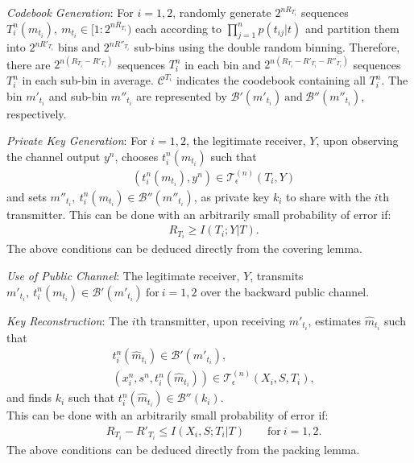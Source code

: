 \documentclass[conference,8pt]{IEEEtran}
\begin{document}
{{{{{{\emph{Codebook Generation}: For $i=1,2$, randomly generate $2^{nR_{T_i}}$ sequences $T^n_{i}(m_{t_i}), \ m_{t_i} \in {[1:2^{nR_{T_i}})}$ each according to $\prod_{j=1}^n p(t_{ij}|t)$ and partition them into $2^{nR'_{T_i}}$ bins and $2^{nR''_{T_i}}$ sub-bins using the double random binning. Therefore, there are $2^{n(R_{T_i}-R'_{T_i})}$ sequences $T^n_{i}$ in each bin and $2^{n(R_{T_i}-R'_{T_i}-R''_{T_i})}$ sequences $T^n_{i}$ in each sub-bin in average. $\mathcal{C}^{T_i}$ indicates the coodebook containing all $T^n_i$. The bin $m'_{t_i}$ and sub-bin $m''_{t_i}$ are represented by $\mathcal{B}'(m'_{t_i}) \ \text{and} \ \mathcal{B}''(m''_{t_i})$, respectively.

\emph{Private Key Generation}: For $i=1, 2$, the legitimate receiver, $Y$, upon observing the channel output $y^n$, chooses $t^n_i(m_{t_i})$ such that
\begin{align}
&(t^n_{i}(m_{t_i}), y^n) \in \mathcal{T}^{(n)}_\epsilon (T_i,Y)
\end{align}
and sets $m''_{t_i}, \ t^n_{i}(m_{t_i}) \in \mathcal{B}''(m''_{t_i})$, as private key $k_i$ to share with the $i\text{th}$ transmitter. 
This can be done with an arbitrarily small probability of error if:
\begin{align}
&R_{T_i} \geq I(T_i;Y|T).
\end{align}
The above conditions can be deduced directly from the covering lemma.

\emph{Use of Public Channel}: The legitimate receiver, $Y$, transmits $m'_{t_i}, \ t^n_{i}(m_{t_i}) \in \mathcal{B}'(m'_{t_i}) \ \text{for} \ i=1,2$ over the backward public channel.

\emph{Key Reconstruction}: The $i\text{th}$ transmitter, upon receiving $m'_{t_i}$, estimates $\hat{m}_{t_i}$ such that
\begin{align}
&t^n_{i}(\hat{m}_{t_i}) \in \mathcal{B}'(m'_{t_i}), \\
&(x^n_{i},s^n,t^n_{i}(\hat{m}_{t_i})) \in \mathcal{T}^{(n)}_\epsilon (X_i,S,T_i),
\end{align}
and finds $k_i$ such that $t^n_{i}(\hat{m}_{t_i}) \in \mathcal{B}''(k_i)$.\\
This can be done with an arbitrarily small probability of error if:
\begin{align}
&R_{T_i}-R'_{T_i} \leq I(X_i,S;T_i|T) \qquad \text{for} \ i=1,2.
\end{align}
The above conditions can be deduced directly from the packing lemma.

}}}}}}
\end{document}
